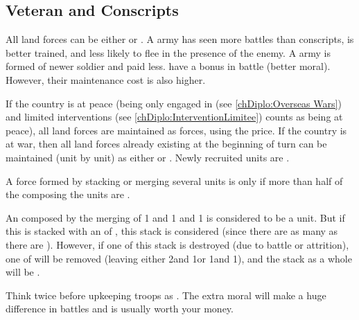 \subsection{Veteran and Conscripts}

 All land forces can be either
 or . A  army has seen more
battles than conscripts, is better trained, and less likely to flee in the
presence of the enemy. A  army is formed of newer soldier and
paid less.
\bparag {} have a bonus in battle (better moral). However, their
maintenance cost is also higher.

 If the country is at peace (being only engaged in
 (see \ref{chDiplo:Overseas Wars}) and limited
interventions (see \ref{chDiplo:InterventionLimitee}) counts as being at
peace), all land forces are maintained as  forces, using the
 price.
\bparag If the country is at war, then all land forces already existing at the
beginning of turn can be maintained (unit by unit) as either 
or . Newly recruited units are .

 A force formed by stacking or merging several units is
 only if more than half of the \LD composing the units are
.
\begin{exemple}
  An \ARMY\faceplus composed by the merging of 1  \LD and 1
   \ARMY\facemoins and 1  \LD is considered to
  be a  unit. But if this \ARMY\faceplus is stacked with an
  \ARMY\facemoins of , this stack is considered
   (since there are as many  as there are
  ). However, if one \LD of this stack is destroyed (due to
  battle or attrition), one \LD of  will be removed (leaving
  either 2\ARMY\facemoins and 1\LD or 1\ARMY\faceplus and 1\LD), and the stack
  as a whole will be .
\end{exemple}

\begin{playtip}
  Think twice before upkeeping troops as . The extra moral
  will make a huge difference in battles and is usually worth your money.
\end{playtip}

